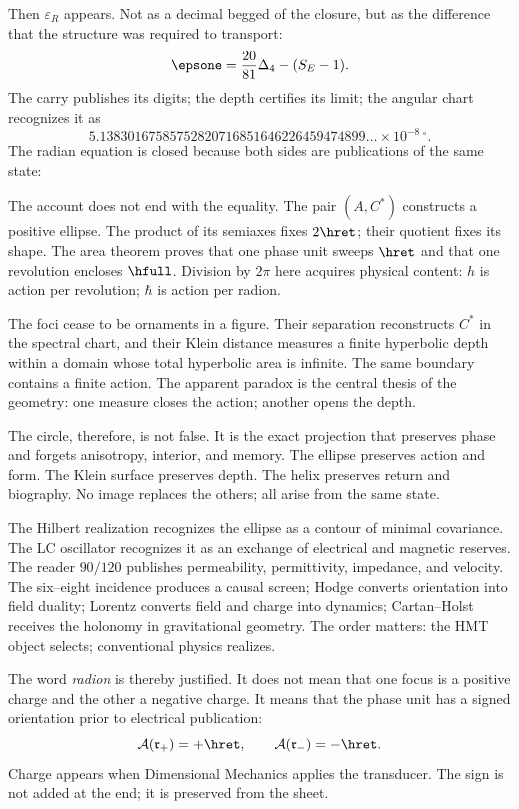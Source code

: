 Then \(\varepsilon_R\) appears. Not as a decimal begged of the
closure, but as the difference that the structure was required to
transport:
\[
\epsone=\frac{20}{81}\Delta_4-(S_E-1).
\]
The carry publishes its digits; the depth certifies its limit; the angular
chart recognizes it as
\[
5.13830167585752820716851646226459474899\ldots
\times10^{-8}\,{}^\circ.
\]
The radian equation is closed because both sides are publications of the
same state:
\BigRadionEquation

The account does not end with the equality. The pair \((A,C^*)\) constructs a
positive ellipse. The product of its semiaxes fixes \(2\hret\); their quotient
fixes its shape. The area theorem proves that one phase unit sweeps
\(\hret\) and that one revolution encloses \(\hfull\). Division by
\(2\pi\) here acquires physical content: \(h\) is action per
revolution; \(\hbar\) is action per radion.

The foci cease to be ornaments in a figure. Their separation reconstructs
\(C^*\) in the spectral chart, and their Klein distance measures a finite
hyperbolic depth within a domain whose total hyperbolic area is
infinite. The same boundary contains a finite action. The apparent paradox
is the central thesis of the geometry: one measure closes the action; another opens
the depth.

The circle, therefore, is not false. It is the exact projection that preserves phase
and forgets anisotropy, interior, and memory. The ellipse preserves action and form.
The Klein surface preserves depth. The helix preserves return and biography. No
image replaces the others; all arise from the same state.

The Hilbert realization recognizes the ellipse as a contour of minimal covariance. The LC oscillator recognizes it as an exchange of electrical and magnetic reserves. The reader \(90/120\) publishes permeability, permittivity, impedance, and velocity. The six--eight incidence produces a causal screen; Hodge converts orientation into field duality; Lorentz converts field and charge into dynamics; Cartan--Holst receives the holonomy in gravitational geometry. The order matters: the HMT object selects; conventional physics realizes.

The word \emph{radion} is thereby justified. It does not mean that one focus is
a positive charge and the other a negative charge. It means that the phase
unit has a signed orientation prior to electrical publication:
\[
\mathcal A(\mathfrak r_+)=+\hret,
\qquad
\mathcal A(\mathfrak r_-)=-\hret.
\]
Charge appears when Dimensional Mechanics applies the transducer. The sign
is not added at the end; it is preserved from the sheet.


